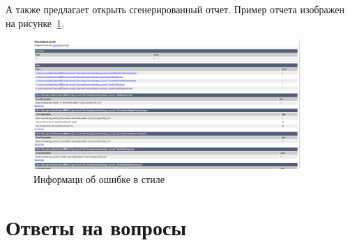 А также предлагает открыть сгенерированный отчет. Пример отчета изображен на
рисунке~\ref{fig:gradle:checkstyle:rep:s}.

\begin{figure}[h!tp]
	\centering
	\includegraphics[width=0.9\textwidth]{png_9}
	\caption{Информаци об ошибке в стиле}
	\label{fig:gradle:checkstyle:rep:s}
\end{figure}

\clearpage

\chapter*{Ответы на вопросы}

